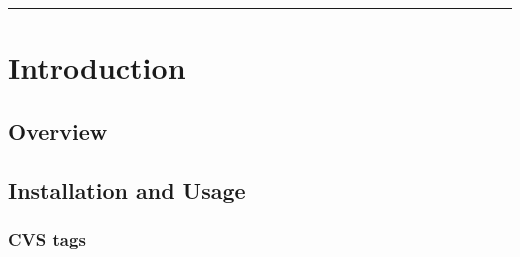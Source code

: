 \documentclass[letterpaper]{book}
\begin{document}
\doparttoc

\frontmatter

\title{\FiPy{}}
\subtitle{A Finite Volume PDE Solver Using Python}

\author{Daniel Wheeler \and Jonathan E. Guyer \and James A. Warren}

\maketitle

\vspace*{\fill}



\rule{\textwidth}{0.1pt}

\thispagestyle{empty}


\tableofcontents

\mainmatter


\part{Introduction}


\renewcommand{\ptctitle}{Introduction Contents}

\parttoc


\chapter{Overview}


  


\chapter{Installation and Usage}
\label{chap:Installation}




\section{CVS tags}
\label{sec:CVS}
\end{document}
